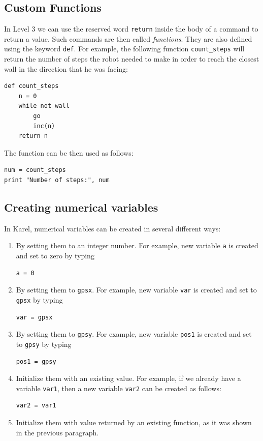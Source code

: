 {{{{\subsection{Custom Functions}

In Level 3 we can use the reserved word {\tt return} inside the body of
a command to return a value. Such commands are then called {\em functions}. 
They are also defined using the keyword {\tt def}. For example, the following function
{\tt count\_steps} will return the number of steps the robot needed to 
make in order to reach the closest wall in the direction that he was facing:

\begin{verbatim}
def count_steps
    n = 0
    while not wall
        go
        inc(n)
    return n
\end{verbatim}
The function can be then used as follows:

\begin{verbatim}
num = count_steps
print "Number of steps:", num 
\end{verbatim}

\subsection{Creating numerical variables} \label{par:var}

In Karel, numerical variables can be created in several different ways: 
\begin{enumerate}
\item By setting them to an integer number. For example, new variable {\tt a} is created and set to zero by typing 
\begin{verbatim}
a = 0
\end{verbatim}
\item By setting them to {\tt gpsx}. For example, new variable {\tt var} is created and set to {\tt gpsx} by typing
\begin{verbatim}
var = gpsx
\end{verbatim}
\item By setting them to {\tt gpsy}. For example, new variable {\tt pos1} is created and set to {\tt gpsy} by typing
\begin{verbatim}
pos1 = gpsy
\end{verbatim}
\item Initialize them with an existing value. For example, if we already have a variable {\tt var1}, then a new variable 
{\tt var2} can be created as follows:
\begin{verbatim}
var2 = var1
\end{verbatim}
\item Initialize them with value returned by an existing function, as it was shown in the previous 
paragraph. 
\end{enumerate}

}}}}
